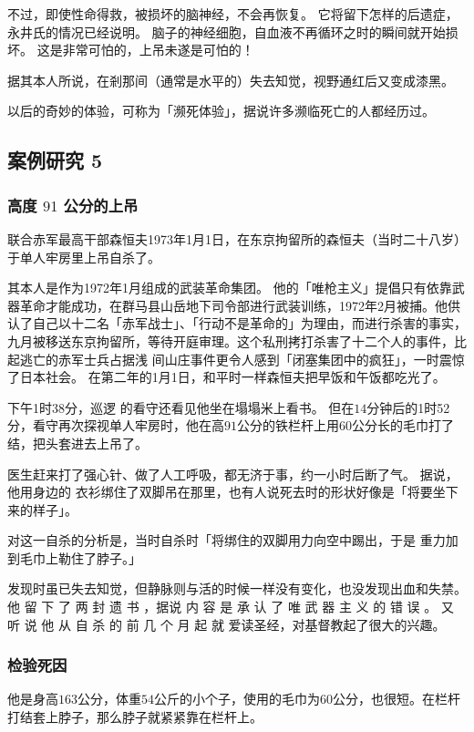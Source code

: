 \documentclass[UTF8]{ctexart}
\begin{document}
不过，即使性命得救，被损坏的脑神经，不会再恢复。
它将留下怎样的后遗症，永井氏的情况已经说明。
脑子的神经细胞，自血液不再循环之时的瞬间就开始损坏。
这是非常可怕的，上吊未遂是可怕的！

据其本人所说，在剎那间（通常是水平的）失去知觉，视野通红后又变成漆黑。

以后的奇妙的体验，可称为「濒死体验」，据说许多濒临死亡的人都经历过。

\subsection{案例研究 5}
\subsubsection*{高度 $91$ 公分的上吊}

联合赤军最高干部森恒夫1973年1月1日，在东京拘留所的森恒夫（当时二十八岁）于单人牢房里上吊自杀了。

其本人是作为1972年1月组成的武装革命集团。
他的「唯枪主义」提倡只有依靠武器革命才能成功，在群马县山岳地下司令部进行武装训练，1972年2月被捕。他供认了自己以十二名「赤军战士」、「行动不是革命的」为理由，而进行杀害的事实，九月被移送东京拘留所，等待开庭审理。这个私刑拷打杀害了十二个人的事件，比起逃亡的赤军士兵占据浅 间山庄事件更令人感到「闭塞集团中的疯狂」，一时震惊了日本社会。 在第二年的1月1日，和平时一样森恒夫把早饭和午饭都吃光了。

下午1时38分，巡逻 的看守还看见他坐在塌塌米上看书。
但在$14$分钟后的1时52分，看守再次探视单人牢房时，他在高$91$公分的铁栏杆上用$60$公分长的毛巾打了结，把头套进去上吊了。

医生赶来打了强心针、做了人工呼吸，都无济于事，约一小时后断了气。
据说，他用身边的 衣衫绑住了双脚吊在那里，也有人说死去时的形状好像是「将要坐下来的样子」。

对这一自杀的分析是，当时自杀时「将绑住的双脚用力向空中踢出，于是 重力加到毛巾上勒住了脖子。」

发现时虽已失去知觉，但静脉则与活的时候一样没有变化，也没发现出血和失禁。 
他 留 下 了 两 封 遗 书 ，据说 内 容 是 承 认 了 唯 武 器 主 义 的 错 误 。
又 听 说 他 从 自 杀 的 前 几 个 月 起 就 爱读圣经，对基督教起了很大的兴趣。

\subsubsection*{检验死因}

他是身高$163$公分，体重$54$公斤的小个子，使用的毛巾为$60$公分，也很短。在栏杆打结套上脖子，那么脖子就紧紧靠在栏杆上。
\end{document}
